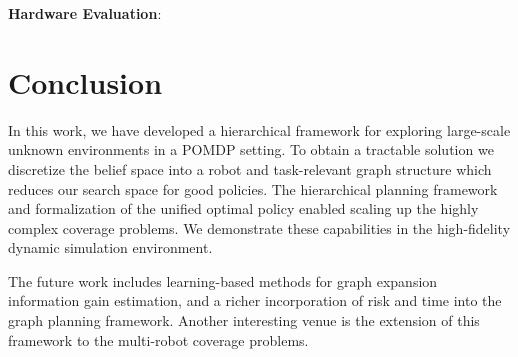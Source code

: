 \documentclass{article}
\newcommand{\ph}[1]{{\textbf{#1}:}} %
\begin{document}
\ph{Hardware Evaluation}

\section{Conclusion}\label{sec:conclusion}

In this work, we have developed a hierarchical framework for exploring large-scale unknown environments in a POMDP setting. 
To obtain a tractable solution we discretize the belief space into a robot and task-relevant graph structure which reduces our search space for good policies.
The hierarchical planning framework and formalization of the unified optimal policy enabled scaling up the highly complex coverage problems.
We demonstrate these capabilities in the high-fidelity dynamic simulation environment.  

The future work includes learning-based methods for graph expansion information gain estimation, and a richer incorporation of risk and time into the graph planning framework.
Another interesting venue is the extension of this framework to the multi-robot coverage problems.


\clearpage{}

\end{document}
